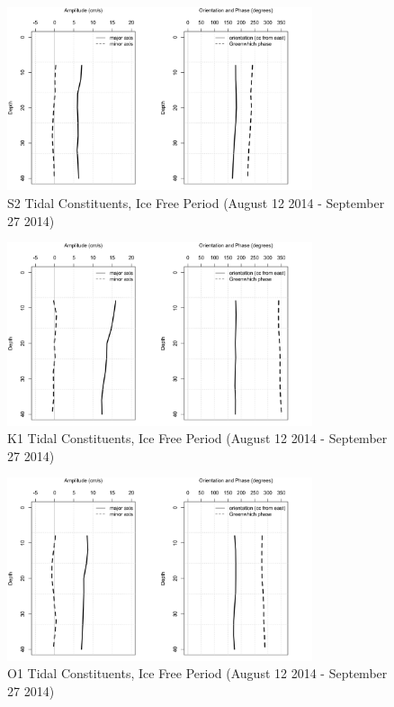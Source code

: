 \documentclass[12pt]{dforeport}
\begin{document}
\begin{figure}  
\centering
\includegraphics[width = 0.8\textwidth]{./figures/49_S2TC_if_2014.png}
\caption[S2 Tidal Constituents, Ice free, 2014]{S2 Tidal Constituents, Ice Free Period (August 12 2014 - September 27 2014)}
\label{f:s2_if_2014}
\end{figure}

\begin{figure}  
\centering
\includegraphics[width = 0.8\textwidth]{./figures/50_K1TC_if_2014.png}
\caption[K1 Tidal Constituents, Ice free, 2014]{K1 Tidal Constituents, Ice Free Period (August 12 2014 - September 27 2014)}
\label{f:k1_if_2014}
\end{figure}

\begin{figure}  
\centering
\includegraphics[width = 0.8\textwidth]{./figures/51_O1TC_if_2014.png}
\caption[O1 Tidal Constituents, Ice free, 2014]{O1 Tidal Constituents, Ice Free Period (August 12 2014 - September 27 2014)}
\label{f:o1_if_2014}
\end{figure}
\end{document}
